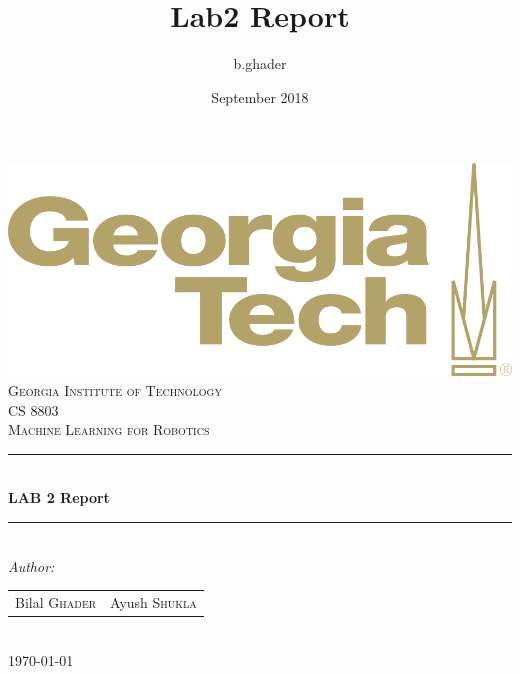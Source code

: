 \documentclass{article}
\title{Lab2 Report}
\author{b.ghader }
\date{September 2018}
\begin{document}
\begin{titlepage}
	
	\newcommand{\HRule}{\rule{\linewidth}{0.5mm}} %
	\center
    \includegraphics[scale = 0.5]{images/gt-logo-gold.png}\\ [1cm]
	\textsc{\LARGE Georgia Institute of Technology}\\[2cm] %
	\textsc{\Large CS 8803 \\ Machine Learning for Robotics}\\[1cm] %
	\HRule \\[1cm]
	{ \huge \bfseries LAB 2 Report}\\[1cm] %
	\HRule \\[1.5cm]
	\Large \emph{Author:}\\
	\begin{tabular}{c c}
	  	Bilal \textsc{Ghader}%
	     & 
	     	Ayush \textsc{Shukla} %
	\end{tabular}
	\\[2cm]


	{\large \today}\\[2cm] %
	\vfill %
	\end{titlepage}
\end{document}
